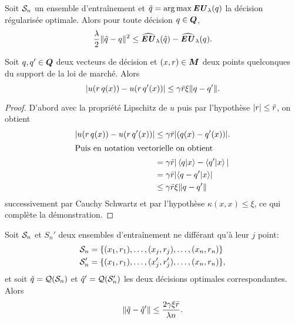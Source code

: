 \begin{lemme}
  \label{lem:conv}
  Soit $\S_n$ un ensemble d'entraînement et $\qh = \argmax\EU_\lambda(q)$ la décision
  régularisée optimale. Alors pour toute décision $q \in \Q$,
  \begin{equation}
    \frac{\lambda}{2}\|\qh - q\|^2 \leq \hEU_\lambda(\qh) - \hEU_\lambda(q).
  \end{equation}
\end{lemme}

\begin{lemme}
  \label{lem:sig}
  Soit $q,q' \in \Q$ deux vecteurs de décision et $(x,r) \in \M$ deux points quelconques du
  support de la loi de marché. Alors
  \begin{equation}
    |u(r\,q(x)) - u(r\,q'(x))| \leq \gamma\rmax\xi\|q-q'\|.
  \end{equation}
\end{lemme}

\begin{proof}
  D'abord avec la propriété Lipschitz de $u$ puis par l'hypothèse $|r|\leq\rmax$, on obtient
  \begin{align}
    |u(r\,q(x)) - u(r\,q'(x))| &\leq \gamma\rmax|(q(x) - q'(x))|.\\
    \intertext{Puis en notation vectorielle on obtient}
                               &=\gamma\rmax|\braket{q|x} - \braket{q'|x}|\\
                               &=\gamma\rmax|\langle q-q'|x \rangle|\\
                               &\leq\gamma\rmax\xi\|q-q'\|
  \end{align}
  successivement par Cauchy Schwartz et par l'hypothèse $\kappa(x,x)\leq\xi$, ce qui complète la
  démonstration.
\end{proof}

\begin{lemme}[Stabilité]
  \label{lem:stab}
  Soit $\S_n$ et $S_n'$ deux ensembles d'entraînement ne différant qu'à leur $j$\ieme
  point:
  \begin{align}
    \S_n &= \{(x_1,r_1),\ldots,(x_j,r_j),\ldots,(x_n,r_n)\}\\
    \S_n' &= \{(x_1,r_1),\ldots,(x'_j,r'_j),\ldots,(x_n,r_n)\},
  \end{align}
  et soit $\qh = \alg(\S_n)$ et $\qh' = \alg(\S_n')$ les deux décisions optimales
  correspondantes. Alors
  \begin{equation}
    \|\qh - \qh'\| \leq \frac{2\gamma\xi\rmax}{\lambda n}.
  \end{equation}
\end{lemme}

